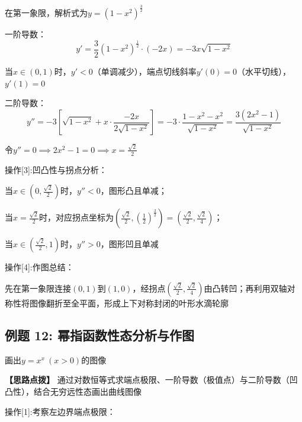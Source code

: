 \documentclass[11pt,a4paper,UTF8]{ctexart}
\begin{document}
\begin{solbox}[分步推导与答题规范]
在第一象限，解析式为$y = (1 - x^2)^{\frac{3}{2}}$

一阶导数：
\begin{equation*}
y' = \frac{3}{2}(1 - x^2)^{\frac{1}{2}} \cdot (-2x) = -3x\sqrt{1 - x^2}
\end{equation*}


  当$x \in (0, 1)$时，$y' < 0$（单调减少），端点切线斜率$y'(0) = 0$（水平切线），$y'(1) = 0$

二阶导数：
\begin{equation*}
y'' = -3\left[\sqrt{1 - x^2} + x \cdot \frac{-2x}{2\sqrt{1 - x^2}}\right] = -3 \cdot \frac{1 - x^2 - x^2}{\sqrt{1 - x^2}} = \frac{3(2x^2 - 1)}{\sqrt{1 - x^2}}
\end{equation*}


  令$y'' = 0 \implies 2x^2 - 1 = 0 \implies x = \frac{\sqrt{2}}{2}$
\end{solbox}

操作[3]:凹凸性与拐点分析：

\begin{solbox}[分步推导与答题规范]
当$x \in \left(0, \frac{\sqrt{2}}{2}\right)$时，$y'' < 0$，图形凸且单减；

当$x = \frac{\sqrt{2}}{2}$时，对应拐点坐标为$\left(\frac{\sqrt{2}}{2}, \left(\frac{1}{2}\right)^{\frac{3}{2}}\right) = \left(\frac{\sqrt{2}}{2}, \frac{\sqrt{2}}{4}\right)$；
\end{solbox}

当$x \in \left(\frac{\sqrt{2}}{2}, 1\right)$时，$y'' > 0$，图形凹且单减

操作[4]:作图总结：

\begin{solbox}[分步推导与答题规范]
先在第一象限连接$(0, 1)$到$(1, 0)$，经拐点$\left(\frac{\sqrt{2}}{2}, \frac{\sqrt{2}}{4}\right)$由凸转凹；再利用双轴对称性将图像翻折至全平面，形成上下对称封闭的叶形水滴轮廓
\end{solbox}


\subsection{例题 12: 幂指函数性态分析与作图}

画出$y = x^x\ (x > 0)$的图像

\textbf{\color{DeepPurple}【思路点拨】} 通过对数恒等式求端点极限、一阶导数（极值点）与二阶导数（凹凸性），结合无穷远性态画出曲线图像


操作[1]:考察左边界端点极限：
\end{document}

